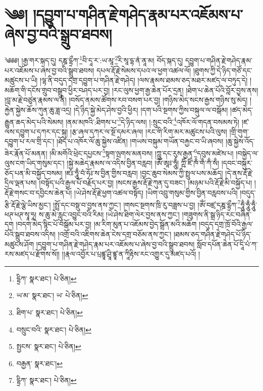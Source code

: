 \setcounter{footnote}{0} 
\chapter{༄༅། །དབྱུག་པ་གཤིན་རྗེ་གཤེད་རྣམ་པར་འཇོམས་པ་ཞེས་བྱ་བའི་སྒྲུབ་ཐབས།}༄༅༅། །རྒྱ་གར་སྐད་དུ། དཎྜ་དྷྲྀཀ་\footnote{དྷྲིཀ་  སྣར་ཐང་།  པེ་ཅིན། }བི་དཱ་ར་:ཡ་མཱ་\footnote{ཡ་མ་  སྣར་ཐང་། ཡ་  པེ་ཅིན། }རི་སཱ་དྷ་ནཾ་ནཱ་མ། བོད་སྐད་དུ། དབྱུག་པ་གཤིན་རྗེ་གཤེད་རྣམ་པར་འཇོམས་པ་ཞེས་བྱ་བའི་སྒྲུབ་ཐབས། དཔལ་རྡོ་རྗེ་སེམས་དཔའ་ལ་ཕྱག་འཚལ་ལོ། །ཐུགས་ཀྱི་དེ་ཉིད་གཙོ་དང་མཚུངས་པ་ཡི། །ལྷ་ནི་བདུད་དགྲ་དབྱུག་པ་གཤིན་རྗེ་གཤེད། །ལས་རྣམས་ཐམས་ཅད་མཐར་མཛད་ལ་བཏུད་དེ། །མཆོག་གི་དངོས་གྲུབ་བསྒྲུབ་ཕྱིར་བཤད་པར་བྱ། །རང་ལུས་ཕྱག་རྒྱ་ཆེན་པོར་དྲན། །ཐེག་པ་ཆེན་པོའི་བློར་བྱས་ནས། །བླ་མ་རྗེ་བཙུན་རྣམས་ལ་ནི། །བསོད་ནམས་ཚོགས་རབ་བསག་པར་བྱ། །གཉིས་མེད་སངས་རྒྱས་གཉིས་སུ་མེད། །རྐྱེན་སྐྱེས་ཆོས་ཀུན་ཆུ་ཟླ་འདྲ། །དེ་ཉིད་སྐྱེ་མེད་ཤེས་བྱའི་ཕྱིར། །དག་པའི་སྔགས་ཀྱིས་བསྐུལ་ལ་བསྒོམ། །ཚད་མེད་རྒྱུན་ཆད་མེད་པའི་སེམས། །ནམ་མཁའི་:ཐིགས་པ་\footnote{ཐིག་པ་  སྣར་ཐང་།  པེ་ཅིན། }དེ་ཉིད་ལས། །:སྲུང་བའི་\footnote{བསྲུང་བའི་  སྣར་ཐང་།  པེ་ཅིན། }འཁོར་ལོ་གདན་བསམས་ཏེ། །ཛ་ལས་དབྱུག་པ་དཀར་དང་སྐུ། །རྩ་ཞལ་དཀར་ལ་སྔོ་དམར་ཞལ། །རང་གི་རིག་མར་མཚུངས་པའི་ལུས། །གྲི་གུག་དབྱུག་པ་རལ་གྲི་དང་། །ཐོད་པ་འཁོར་ལོ་ཆུ་སྐྱེས་འཛིན། །གཡས་བསྐུམ་གཡོན་བརྐྱང་བ་ཡི་ཞབས། །ཆུ་སྐྱེས་འོད་ཟེར་རྣོན་པོ་མནན། །མི་མགོའི་ཕྲེང་དཔྱངས་\footnote{སྤྱངས་  སྣར་ཐང་།  པེ་ཅིན། }སྟག་ལྤགས་མནབས། །ཀླུ་དང་རུས་རྒྱན་\footnote{བརྒྱན་  སྣར་ཐང་། }དབུས་མཛེས་པ། །བསྐྱེད་ལ་ལུས་ངག་ཡིད་གསུམ་དང་། །སྐྱེ་མཆེད་རྣམས་ལ་འདིས་བྱིན་བརླབ། །ཨོཾ་ཨཱཿ་ཧཱུྃ། ཀྵིཾ་ཛིཾ་ཁྃ་གྃ་ཀྃ་སྃ། །དབང་བསྐུར་ཅོད་པན་མི་བསྐྱོད་བསམ། །ཛཿ་ཧཱུྃ་བཾ་ཧོཿ་ས་བྱིན་གྱིས་བརླབ། །བྱང་ཆུབ་སེམས་ཀྱི་སྤྲུལ་པས་མཆོད། །དེ་ནས་རྡོ་རྗེ་དྲིལ་ལྡན་པས། །བསྟོད་པའི་རྒྱལ་པོ་བརྗོད་པར་བྱ། །སངས་རྒྱས་རྡོ་རྗེ་ཀུན་དུ་བཟང་། །མཉམ་པའི་རྡོ་རྗེ་མི་བསྐྱོད་པ། །རྡོ་རྗེ་གསང་བ་དབྱིངས་ཆེན་པོ། །ཡེ་ཤེས་རྡོ་རྗེ་ཕྱག་འཚལ་བསྟོད། །ཡིག་འབྲུ་གསུམ་གྱིས་བྱིན་བརླབས་པའི། །བདུད་རྩི་རྡོ་རྗེ་ལྕེ་ཡིས་མྱང་། །སྤྲོ་དང་བསྡུ་བ་བྱས་ནས་ཀྱང་། །གསང་སྔགས་ཁྲི་རུ་བཟླས་པ་བྱ། །ཨོཾ་བཛྲ་དཎྜ་དྷྲྀཀ་\footnote{དྷྲིཀ་  སྣར་ཐང་།  པེ་ཅིན། }ཧཱུྃ་ཧཱུྃ་ཧཱུྃ་ཕཊ་ཕཊ་སྭཱ་ཧཱ། ས་ཆུ་མེ་རླུང་འབྱུང་བའི་རིམ། །ཡེ་ཤེས་ཐིག་ལེར་བྱས་ནས་ཀྱང་། །གཟུགས་ནི་སྒྲ་ཉིད་རང་བཞིན་དག །བདག་མེད་སྙིང་པོ་བསྒོམ་པར་བྱ། །མ་རིག་མུན་པ་འཇོམས་བྱེད་སྒྲོན་མའི་མཆོག །བདུད་དགྲ་ཁྲོ་བོའི་རྒྱལ་པོའི་སྒྲུབ་ཐབས་འདིས། །འགྲོ་བའི་འཇིགས་ཆེན་ངེས་དགྲ་བཅོམ་ནས་ཀྱང་། །ཐམས་ཅད་གཤིན་རྗེ་གཤེད་པོ་ཉིད་མཚུངས་ཤོག །དབྱུག་པ་གཤིན་རྗེ་གཤེད་རྣམ་པར་འཇོམས་པ་ཞེས་བྱ་བའི་སྒྲུབ་ཐབས། སློབ་དཔོན་ཆེན་པོ་དཱི་པཾ་ཀ་རས་མཛད་པ་རྫོགས་སོ།། །།རྣལ་འབྱོར་པ་པྲཛྙཱ་ཤྲཱི་ཛྙཱ་ན་ཀཱིརྟིས་རང་འགྱུར་དུ་མཛད་པའོ། །
 